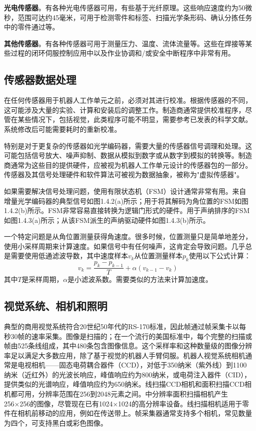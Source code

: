 \documentclass[UTF8,a4paper]{ctexart}
\begin{document}
\textbf{光电传感器}。有各种光电传感器可用，有些基于光纤原理。这些响应速度约为50微秒，范围可达约45毫米，可用于检测零件和标签、扫描光学条形码、确认分拣任务中的零件通过等。

\textbf{其他传感器}。有各种传感器可用于测量压力、温度、流体流量等。这些在焊接等某些过程的闭环伺服控制应用中以及作业协调和/或安全中断程序中非常有用。

\subsection{传感器数据处理}

在任何传感器用于机器人工作单元之前，必须对其进行校准。根据传感器的不同，这可能涉及大量的实验、计算和安装后的调整工作。制造商通常提供校准程序，尽管在某些情况下，包括视觉，此类程序可能不明显，需要参考已发表的科学文献。系统修改后可能需要耗时的重新校准。

特别是对于更复杂的传感器如光学编码器，需要大量的传感器信号调理和处理。这可能包括信号放大、噪声抑制、数据从模拟到数字或从数字到模拟的转换等。制造商通常为这些目的提供硬件，应被视为机器人工作单元设计的传感器包的一部分。传感器及其信号处理硬件和软件算法可被视为数据抽象，被称为"虚拟传感器"。

如果需要解决信号处理问题，使用有限状态机（FSM）设计通常非常有用。来自增量光学编码器的典型信号如图1.4.2(a)所示；用于将其解码为角位置的FSM如图1.4.2(b)所示。FSM非常容易直接转换为逻辑门形式的硬件。用于声纳排序的FSM如图1.4.3(a)所示；从该FSM派生的声纳驱动硬件如图1.4.3(b)所示。

一个特定问题是从角位置测量获得角速度。很多时候，位置测量只是简单地差分，使用小采样周期来计算速度。如果信号中有任何噪声，这肯定会导致问题。几乎总是需要使用低通滤波导数，其中速度样本$v_k$从位置测量样本$p_k$使用以下公式计算：
\[
v_k = \frac{p_k - p_{k-1}}{T} + \alpha (v_{k-1} - v_k)
\]
其中$T$是采样周期，$\alpha$是小滤波系数。需要类似的方法来计算加速度。

\subsection{视觉系统、相机和照明}

典型的商用视觉系统符合20世纪50年代的RS-170标准，因此帧通过帧采集卡以每秒30帧的速率采集。图像是扫描的；在一个流行的美国标准中，每个完整的扫描或帧由525条线组成，其中480条包含图像信息。这个采样率和这种数量级的图像分辨率足以满足大多数应用，除了基于视觉的机器人手臂伺服。机器人视觉系统相机通常是电视相机——固态电荷耦合器件（CCD），对低于350纳米（紫外线）到1100纳米（近红外）的光波长响应，峰值响应约为800纳米，或电荷注入器件（CID），提供类似的光谱响应，峰值响应约为650纳米。线扫描CCD相机和面积扫描CCD相机都可用，分辨率范围在256到2048元素之间。中分辨率面积扫描相机产生256×256的图像，尽管现在已有1024×1024的高分辨率设备。线扫描相机适用于零件在相机前移动的应用，例如在传送带上。帧采集器通常支持多个相机，常见数量为四个，可支持黑白或彩色图像。
\end{document}
